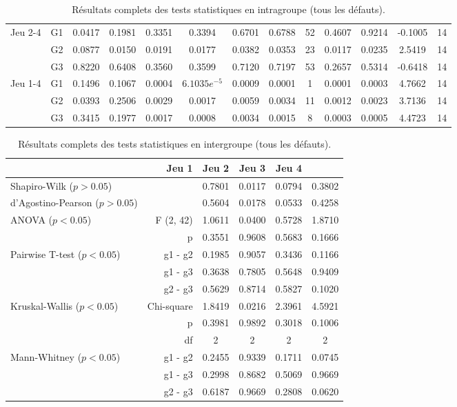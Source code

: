 {\begin{landscape}
\begin{table}[H]
\begin{tabular}{ll|cc|ccccc|cccc}
\multirow{3}{*}{Jeu 2-4} & G1 & 0.0417 & 0.1981 & 0.3351 & 0.3394 & 0.6701 & 0.6788 & 52 & 0.4607 & 0.9214 & -0.1005 & 14 \\
 & G2 & 0.0877 & 0.0150 & 0.0191 & 0.0177 & 0.0382 & 0.0353 & 23 & 0.0117 & 0.0235 & 2.5419 & 14 \\
 & G3 & 0.8220 & 0.6408 & 0.3560 & 0.3599 & 0.7120 & 0.7197 & 53 & 0.2657 & 0.5314 & -0.6418 & 14 \\\hline
\multirow{3}{*}{Jeu 1-4} & G1 & 0.1496 & 0.1067 & 0.0004 & $6.1035e^{-5}$ & 0.0009 & 0.0001 & 1 & 0.0001 & 0.0003 & 4.7662 & 14 \\
 & G2 & 0.0393 & 0.2506 & 0.0029 & 0.0017 & 0.0059 & 0.0034 & 11 & 0.0012 & 0.0023 & 3.7136 & 14 \\
 & G3 & 0.3415 & 0.1977 & 0.0017 & 0.0008 & 0.0034 & 0.0015 & 8 & 0.0003 & 0.0005 & 4.4723 & 14
\end{tabular}
\caption{Résultats complets des tests statistiques en intragroupe (tous les défauts).}
\end{table}
\end{landscape}}



\begin{table}[H]
\begin{tabular}{lr|cccc}
& Jeu 1 & Jeu 2 & Jeu 3 & Jeu 4 \\\hline
Shapiro-Wilk ($p > 0.05$) & & 0.7801 & 0.0117 & 0.0794 & 0.3802 \\
d'Agostino-Pearson ($p > 0.05$) & & 0.5604 & 0.0178 & 0.0533 & 0.4258 \\\hline
\multirow{2}{*}{ANOVA ($p < 0.05$)} & F (2, 42) & 1.0611 & 0.0400 & 0.5728 & 1.8710 \\
 & p & 0.3551 & 0.9608 & 0.5683 & 0.1666 \\\hline
\multirow{3}{*}{Pairwise T-test ($p < 0.05$)} & g1 - g2 & 0.1985 & 0.9057 & 0.3436 & 0.1166 \\
 & g1 - g3 & 0.3638 & 0.7805 & 0.5648 & 0.9409 \\
 & g2 - g3 & 0.5629 & 0.8714 & 0.5827 & 0.1020 \\\hline
\multirow{3}{*}{Kruskal-Wallis ($p < 0.05$)} & Chi-square & 1.8419 & 0.0216 & 2.3961 & 4.5921 \\
 & p & 0.3981 & 0.9892 & 0.3018 & 0.1006 \\
 & df & 2 & 2 & 2 & 2 \\\hline
\multirow{3}{*}{Mann-Whitney ($p < 0.05$)} & g1 - g2 & 0.2455 & 0.9339 & 0.1711 & 0.0745 \\
 & g1 - g3 & 0.2998 & 0.8682 & 0.5069 & 0.9669 \\
 & g2 - g3 & 0.6187 & 0.9669 & 0.2808 & 0.0620
\end{tabular}
\caption{Résultats complets des tests statistiques en intergroupe (tous les défauts).}
\end{table}